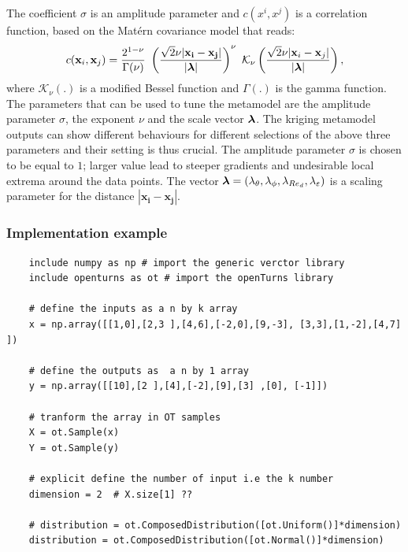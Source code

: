 The coefficient $\sigma$ is an amplitude parameter and $c(x^i, x^j)$ is a correlation function, based on the Mat\'ern covariance model that reads:
\begin{equation}
c(\mathbf{x}_{i} , \mathbf{x}_{j}) =  \dfrac{2^{1- \nu}}{\Gamma(\nu)} \  \left( \dfrac{\sqrt{2} \nu |\mathbf{x_i} - \mathbf{x_j}|}{|\bs{\lambda}|} \right)^{\nu} \ \mathcal{K}_{\nu}\left( \dfrac{\sqrt{2} \nu |\mathbf{x}_i - \mathbf{x}_j|}{|\bs{\lambda}|} \right),
\label{eq:matern2}
\end{equation}
where $\mathcal{K}_{\nu}(.)$ is a modified Bessel function and $\Gamma(.)$ is the gamma function.
The parameters that can be used to tune the metamodel are the amplitude parameter $\sigma$, the exponent $\nu$ and the scale vector $\boldsymbol{\lambda}$.
The kriging metamodel outputs can show different behaviours for different selections of the above three parameters and their setting is thus crucial. 
The amplitude parameter $\sigma$ is chosen to be equal to $1$; larger value lead to steeper gradients and undesirable local extrema around the data points.
The vector $\boldsymbol{\lambda}=(\lambda_{\theta}, \lambda_{\phi}, \lambda_{Re_d}, \lambda_{\varepsilon} )$ is a scaling parameter for the distance $ |\mathbf{x_i} - \mathbf{x_j}|$.

\subsubsection{Implementation example}



\begin{verbatim}
	include numpy as np # import the generic verctor library
	include openturns as ot # import the openTurns library
	
	# define the inputs as a n by k array
	x = np.array([[1,0],[2,3 ],[4,6],[-2,0],[9,-3], [3,3],[1,-2],[4,7] ])
	
	# define the outputs as  a n by 1 array
	y = np.array([[10],[2 ],[4],[-2],[9],[3] ,[0], [-1]])
	
	# tranform the array in OT samples
	X = ot.Sample(x)
	Y = ot.Sample(y)
	
	# explicit define the number of input i.e the k number
	dimension = 2  # X.size[1] ??
	
	# distribution = ot.ComposedDistribution([ot.Uniform()]*dimension)
	distribution = ot.ComposedDistribution([ot.Normal()]*dimension)
\end{verbatim}